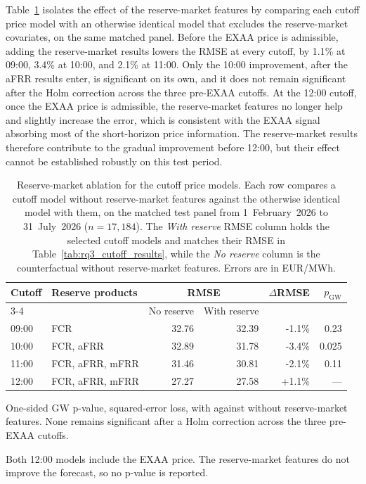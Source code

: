 Table~\ref{tab:reserve_ablation} isolates the effect of the reserve-market
features by comparing each cutoff price model with an otherwise identical model
that excludes the reserve-market covariates, on the same matched panel. Before
the EXAA price is admissible, adding the reserve-market results lowers the RMSE
at every cutoff, by 1.1\% at 09:00, 3.4\% at 10:00, and 2.1\% at 11:00. Only the
10:00 improvement, after the aFRR results enter, is significant on its own, and
it does not remain significant after the Holm correction across the three
pre-EXAA cutoffs. At the 12:00 cutoff, once the EXAA price is admissible, the
reserve-market features no longer help and slightly increase the error, which is
consistent with the EXAA signal absorbing most of the short-horizon price
information. The reserve-market results therefore contribute to the gradual
improvement before 12:00, but their effect cannot be established robustly on
this test period.

\begin{table}[H]
  \centering
  \small
  \caption[Reserve-market ablation for the cutoff price models.]
  {Reserve-market ablation for the cutoff price models. Each row compares a
  cutoff model without reserve-market features against the otherwise identical
  model with them, on the matched test panel from 1~February~2026 to
  31~July~2026 (\(n=17{,}184\)). The \emph{With reserve} \mbox{RMSE} column holds
  the selected cutoff models and matches their RMSE in
  Table~\ref{tab:rq3_cutoff_results}, while the \emph{No reserve} column is the
  counterfactual without reserve-market features. Errors are in EUR/MWh.}
  \label{tab:reserve_ablation}
  \begin{threeparttable}
  \begin{tabular}{@{}llrrrr@{}}
    \toprule
    Cutoff & Reserve products & \multicolumn{2}{c}{RMSE}
      & \(\Delta\)RMSE & \(p_{\mathrm{GW}}\)\tnote{a} \\
    \cmidrule(lr){3-4}
    & & No reserve & With reserve & & \\
    \midrule
    09:00 & FCR & 32.76 & 32.39 & -1.1\% & 0.23 \\
    10:00 & FCR, aFRR & 32.89 & 31.78 & -3.4\% & 0.025 \\
    11:00 & FCR, aFRR, mFRR & 31.46 & 30.81 & -2.1\% & 0.11 \\
    12:00\tnote{b} & FCR, aFRR, mFRR & 27.27 & 27.58 & +1.1\% & --- \\
    \bottomrule
  \end{tabular}
  \begin{tablenotes}[flushleft]
    \footnotesize
    \item[a] One-sided GW p-value, squared-error loss, with against
    without reserve-market features. None remains significant after a Holm
    correction across the three pre-EXAA cutoffs.
    \item[b] Both 12:00 models include the EXAA price. The reserve-market features
    do not improve the forecast, so no p-value is reported.
  \end{tablenotes}
  \end{threeparttable}
\end{table}

